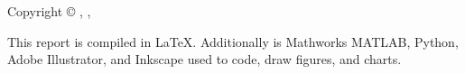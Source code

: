 \thispagestyle{empty}
{\small
\strut\vfill %
\noindent Copyright \copyright{} \projectGroup{}, \projectFaculty{}, \AAU{} \the\year\par%
\vspace{0.2cm}
\noindent This report is compiled in \LaTeX. Additionally is Mathworks MATLAB, Python, Adobe Illustrator, and  Inkscape used to code, draw figures, and charts.
}
\clearpage
